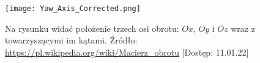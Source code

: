 \begin{figure}[H]
    \centering
    \texttt{[image: Yaw\_Axis\_Corrected.png]}
    \centering
    \caption{Na rysunku widać położenie trzech osi obrotu: $Ox$, $Oy$ i $Oz$ wraz z towarzyszącymi im kątami. Źródło: \url{https://pl.wikipedia.org/wiki/Macierz_obrotu} [Dostęp: 11.01.22]}
\end{figure}










